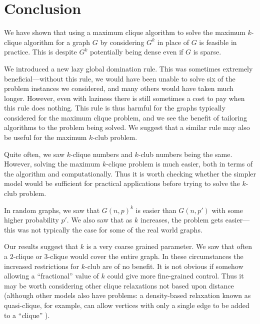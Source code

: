 \documentclass[letterpaper]{article}
\begin{document}
\section{Conclusion}

We have shown that using a maximum clique algorithm to solve the maximum $k$-clique algorithm for a
graph $G$ by considering $G^k$ in place of $G$ is feasible in practice. This is despite $G^k$
potentially being dense even if $G$ is sparse.

We introduced a new lazy global domination rule. This was sometimes extremely beneficial---without
this rule, we would have been unable to solve six of the problem instances we considered, and many
others would have taken much longer. However, even with laziness there is still sometimes a cost to
pay when this rule does nothing. This rule is thus harmful for the graphs typically considered for
the maximum clique problem, and we see the benefit of tailoring algorithms to the problem being
solved. We suggest that a similar rule may also be useful for the maximum $k$-club problem.

Quite often, we saw $k$-clique numbers and $k$-club numbers being the same. However, solving the
maximum $k$-clique problem is much easier, both in terms of the algorithm and computationally. Thus
it is worth checking whether the simpler model would be sufficient for practical applications before
trying to solve the $k$-club problem.

In random graphs, we saw that $G(n, p)^k$ is easier than $G(n, p')$ with some higher probability
$p'$. We also saw that as $k$ increases, the problem gets easier---this was not typically the case
for some of the real world graphs.

Our results suggest that $k$ is a very coarse grained parameter. We saw that often a $2$-clique or
$3$-clique would cover the entire graph. In these circumstances the increased restrictions for
$k$-club are of no benefit. It is not obvious if somehow allowing a ``fractional'' value of $k$
could give more fine-grained control. Thus it may be worth considering other clique relaxations not
based upon distance (although other models also have problems: a density-based relaxation known as
quasi-clique, for example, can allow vertices with only a single edge to be added to a ``clique''
\cite{Abello:2002}).



\end{document}
